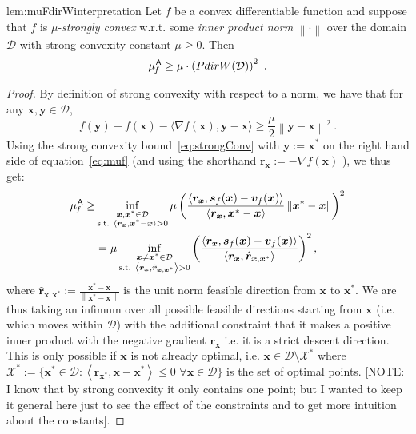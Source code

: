 \documentclass{article} %
\providecommand{\norm}[1]{\left\lVert#1\right\rVert}
\newcommand{\X}{\mathcal{X}}
\newcommand{\domain}{\mathcal{D}}
\newcommand{\away}{{\hspace{0.06em}\textsf{A}}}
\newcommand{\strongConvMFW}{\mu_{\hspace{-0.08em}f}^\away}
\newcommand{\x}{\bm{x}}
\newcommand{\y}{\bm{y}}
\newcommand{\s}{\bm{s}}
\newcommand{\vv}{\bm{v}} %
\renewcommand{\r}{\bm{r}}
\newcommand{\PdirW}{\mathop{PdirW}}
\newcommand{\innerProd}[2]{\left\langle #1 , #2 \right\rangle}
\newcommand{\0}{\mathbf{0}} %
\begin{document}
%

\begin{replemma}{lem:muFdirWinterpretation}
Let $f$ be a convex differentiable function and suppose that $f$ is $\mu$-\emph{strongly convex} w.r.t. some \emph{inner product norm} $\norm{\cdot}$ over the domain $\domain$ with strong-convexity constant $\mu \geq 0$. Then
\[
\strongConvMFW \geq \mu \cdot \left( \PdirW(\domain) \right)^2 \ .
\] 
\end{replemma}
%
\begin{proof}
By definition of strong convexity with respect to a norm, we have that for any $\x,\y\in\domain$,
\begin{equation} \label{eq:strongConv}
f(\y)- f(\x)- \langle\nabla f(\x), \y-\x \rangle
\geq \textstyle\frac{\mu}{2} \norm{\y-\x}^2 \ .
\end{equation}
Using the strong convexity bound~\eqref{eq:strongConv} with $\y := \x^*$ on the right hand side of equation~\eqref{eq:muf} (and using the shorthand $\r_{\x} := -\nabla f(\x)$ ), we thus get:
\begin{align}
\strongConvMFW \geq&  \inf_{\substack{\x, \x^* \in \domain\\
                                   \textrm{s.t. } \innerProd{\r_{\x}}{\x^*-\x} > 0}}
                      \mu \left(  \frac{\innerProd{\r_{\x}}{ \s_f(\x) - \vv_f(\x)}}{\innerProd{\r_{\x}}{\x^*-\x}} \norm{{\x^*-\x}} \right)^2 \nonumber \\
		&=  \mu \inf_{\substack{\x \neq \x^* \in \domain \\
                        \textrm{s.t. } \innerProd{\r_{\x}}{ \hat{\r}_{\x,\x^*}} > 0}}
           \left(  \frac{\innerProd{\r_{\x}}{ \s_f(\x) - \vv_f(\x)}}{\innerProd{\r_{\x}}{ \hat{\r}_{\x,\x^*}}} \right)^2  , \label{eq:mufInitial}
\end{align}
where $\hat{\r}_{\x,\x^*} := \frac{\x^*-\x}{\norm{\x^*-\x}}$ is the unit norm feasible direction from $\x$ to $\x^*$. We are thus taking an infimum over all possible feasible directions starting from $\x$ (i.e. which moves within $\domain$) with the additional constraint that it makes a positive inner product with the negative gradient $\r_{\x}$ i.e. it is a strict descent direction. This is only possible if $\x$ is not already optimal, i.e. $\x \in \domain \setminus \X^*$ where $\X^* := \{\x^* \in \domain : \innerProd{\r_{\x^*}}{\x-\x^*} \leq 0 \,\, \forall \x \in \domain \}$ is the set of optimal points. {\small[NOTE: I know that by strong convexity it only contains one point; but I wanted to keep it general here just to see the effect of the constraints and to get more intuition about the constants]}.


\end{proof}
\end{document}
